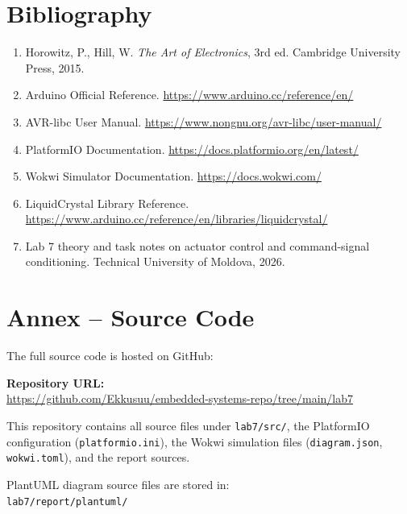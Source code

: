 \documentclass[12pt]{article}
\begin{document}
\section*{Bibliography}
\begin{enumerate}
    \item Horowitz, P., Hill, W. \textit{The Art of Electronics}, 3rd ed. Cambridge University Press, 2015.
    \item Arduino Official Reference. \url{https://www.arduino.cc/reference/en/}
    \item AVR-libc User Manual. \url{https://www.nongnu.org/avr-libc/user-manual/}
    \item PlatformIO Documentation. \url{https://docs.platformio.org/en/latest/}
    \item Wokwi Simulator Documentation. \url{https://docs.wokwi.com/}
    \item LiquidCrystal Library Reference. \url{https://www.arduino.cc/reference/en/libraries/liquidcrystal/}
    \item Lab 7 theory and task notes on actuator control and command-signal conditioning. Technical University of Moldova, 2026.
\end{enumerate}

\FloatBarrier
\section*{Annex -- Source Code}

The full source code is hosted on GitHub:

\bigskip
\noindent\textbf{Repository URL:}\\
\url{https://github.com/Ekkusuu/embedded-systems-repo/tree/main/lab7}

\bigskip
\noindent This repository contains all source files under \texttt{lab7/src/}, the PlatformIO configuration (\texttt{platformio.ini}), the Wokwi simulation files (\texttt{diagram.json}, \texttt{wokwi.toml}), and the report sources.

\bigskip
\noindent PlantUML diagram source files are stored in:\\
\texttt{lab7/report/plantuml/}
\end{document}
